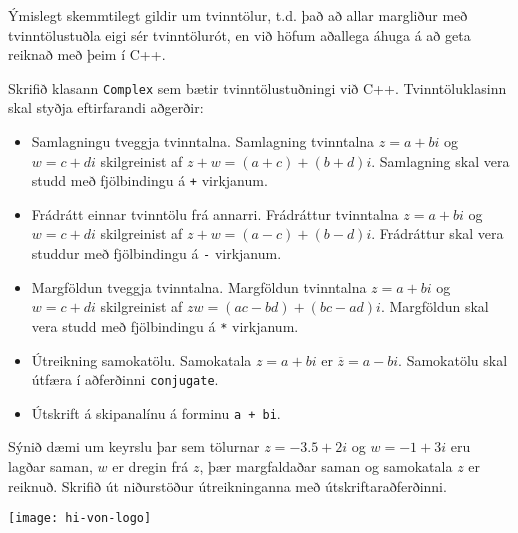 \documentclass{article}
\begin{document}
Ýmislegt skemmtilegt gildir um tvinntölur, t.d. það að allar margliður með tvinntölustuðla eigi sér tvinntölurót, en við höfum aðallega áhuga á að geta reiknað með þeim í C++.

Skrifið klasann \texttt{Complex} sem bætir tvinntölustuðningi við C++. Tvinntöluklasinn skal styðja eftirfarandi aðgerðir:

\begin{itemize}
 \item Samlagningu tveggja tvinntalna. Samlagning tvinntalna $z = a + bi$ og $w = c + di$ skilgreinist af $z + w = (a+c) + (b+d)i$. Samlagning skal vera studd með fjölbindingu á \texttt{+} virkjanum.
 \item Frádrátt einnar tvinntölu frá annarri. Frádráttur tvinntalna $z = a + bi$ og $w = c + di$ skilgreinist af $z + w = (a-c) + (b-d)i$. Frádráttur skal vera studdur með fjölbindingu á \texttt{-} virkjanum.
 \item Margföldun tveggja tvinntalna. Margföldun tvinntalna $z = a + bi$ og $w = c + di$ skilgreinist af $zw = (ac -bd) + (bc-ad)i$.
 Margföldun skal vera studd með fjölbindingu á \texttt{*} virkjanum.
 \item Útreikning samokatölu. Samokatala $z = a+bi$ er $\overline{z} = a-bi$. Samokatölu skal útfæra í aðferðinni \texttt{conjugate}.
 \item Útskrift á skipanalínu á forminu \texttt{a + bi}.
\end{itemize}
Sýnið dæmi um keyrslu þar sem tölurnar $z = -3.5 + 2i$ og $w = -1+3i$ eru lagðar saman, $w$ er dregin frá $z$, þær margfaldaðar saman og samokatala $z$ er reiknuð. Skrifið út niðurstöður útreikninganna með útskriftaraðferðinni.

\vfill
\texttt{[image: hi-von-logo]}
\end{document}
